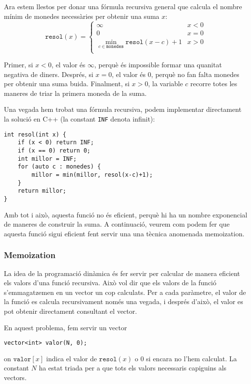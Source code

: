 Ara estem llestos per donar una fórmula recursiva general
que calcula el nombre mínim de
monedes necessàries per obtenir una suma $x$:
\begin{equation*}
    \texttt{resol}(x) = \begin{cases}
               \infty & x < 0\\
               0 & x = 0\\
               \min_{c \in \texttt{monedes}} \texttt{resol}(x-c)+1 & x > 0 \\
           \end{cases}
\end{equation*}

Primer, si $x<0$, el valor és $\infty$,
perquè és impossible formar una quanitat negativa
de diners.
Després, si $x=0$, el valor és $0$,
perquè no fan falta monedes per obtenir una suma buida.
Finalment, si $x>0$, la variable $c$
recorre totes les maneres de triar la primera moneda
de la suma.

Una vegada hem trobat una fórmula recursiva,
podem implementar directament la solució en C++
(la constant \texttt{INF} denota infinit):

\begin{lstlisting}
int resol(int x) {
    if (x < 0) return INF;
    if (x == 0) return 0;
    int millor = INF;
    for (auto c : monedes) {
        millor = min(millor, resol(x-c)+1);
    }
    return millor;
}
\end{lstlisting}

Amb tot i això, aquesta funció no és eficient,
perquè hi ha un nombre exponencial de maneres
de construir la suma.
A continuació, veurem com podem fer que aquesta
funció sigui eficient fent servir una una tècnica
anomenada memoization.

\subsubsection{Memoization}


La idea de la programació dinàmica és fer servir
 per calcular de manera eficient
els valors d'una funció recursiva.
Això vol dir que els valors de la funció
s'emmagatzemen en un vector un cop calculats.
Per a cada paràmetre, el valor de la funció
es calcula recursivament només una vegada, i després d'això,
el valor es pot obtenir directament consultant el vector.

En aquest problema, fem servir un vector
\begin{lstlisting}
vector<int> valor(N, 0);
\end{lstlisting}
on $\texttt{valor}[x]$
indica el valor de $\texttt{resol}(x)$ o $0$
si encara no l'hem calculat.
La constant $N$ ha estat triada per a que tots els valors
necessaris capiguins als vectors.

